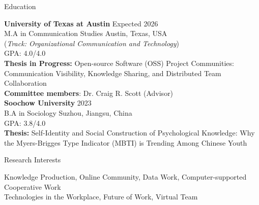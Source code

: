 \documentclass[
	11pt, %
]{resume} %
\begin{document}

\begin{rSection}{Education}
	
	\textbf{University of Texas at Austin} \hfill Expected 2026\\
	M.A in Communication Studies \hfill Austin, Texas, USA \\
	(\textit{Track: Organizational Communication and Technology}) \smallskip \\
	GPA: 4.0/4.0\\
    \textbf{Thesis in Progress:} Open-source Software (OSS) Project Communities: Communication Visibility, Knowledge Sharing, and Distributed Team Collaboration\\
    \textbf{Committee members}: Dr. Craig R. Scott (Advisor)\\

    \textbf{Soochow University} \hfill 2023 \\ 
	B.A in Sociology \hfill Suzhou, Jiangsu, China \\
	GPA: 3.8/4.0\\
    \textbf{Thesis:} Self-Identity and Social Construction of Psychological Knowledge: Why the Myers-Brigges Type Indicator (MBTI) is Trending Among Chinese Youth\\
	
\end{rSection}

\begin{rSection}{Research Interests}

Knowledge Production, Online Community, Data Work, Computer-supported Cooperative Work\\
Technologies in the Workplace, Future of Work, Virtual Team\\

\end{rSection}

\end{document}
